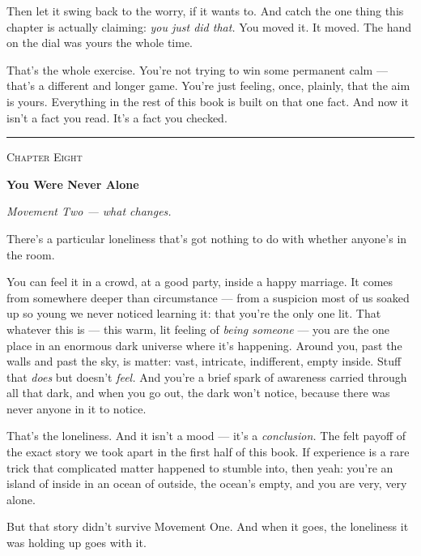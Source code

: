 \documentclass[11pt,openany]{book}
\begin{document}
Then let it swing back to the worry, if it wants to. And catch the one thing this chapter is actually claiming: \textit{you just did that.} You moved it. It moved. The hand on the dial was yours the whole time.

That’s the whole exercise. You’re not trying to win some permanent calm — that’s a different and longer game. You’re just feeling, once, plainly, that the aim is yours. Everything in the rest of this book is built on that one fact. And now it isn’t a fact you read. It’s a fact you checked.
\endgroup\par\smallskip
{\noindent\color{rule}\rule{\linewidth}{0.8pt}}
\bigskip


\clearpage
\vspace*{0.6in}
{\centering\scshape\large Chapter Eight\par}
\vspace{0.8em}
{\centering\bfseries\fontsize{20}{24}\selectfont You Were Never Alone\par}
\vspace{1.6em}

\textit{Movement Two — what changes.}

There’s a particular loneliness that’s got nothing to do with whether anyone’s in the room.

You can feel it in a crowd, at a good party, inside a happy marriage. It comes from somewhere deeper than circumstance — from a suspicion most of us soaked up so young we never noticed learning it: that you’re the only one lit. That whatever this is — this warm, lit feeling of \textit{being someone} — you are the one place in an enormous dark universe where it’s happening. Around you, past the walls and past the sky, is matter: vast, intricate, indifferent, empty inside. Stuff that \textit{does} but doesn’t \textit{feel.} And you’re a brief spark of awareness carried through all that dark, and when you go out, the dark won’t notice, because there was never anyone in it to notice.

That’s the loneliness. And it isn’t a mood — it’s a \textit{conclusion.} The felt payoff of the exact story we took apart in the first half of this book. If experience is a rare trick that complicated matter happened to stumble into, then yeah: you’re an island of inside in an ocean of outside, the ocean’s empty, and you are very, very alone.

But that story didn’t survive Movement One. And when it goes, the loneliness it was holding up goes with it.
\end{document}
